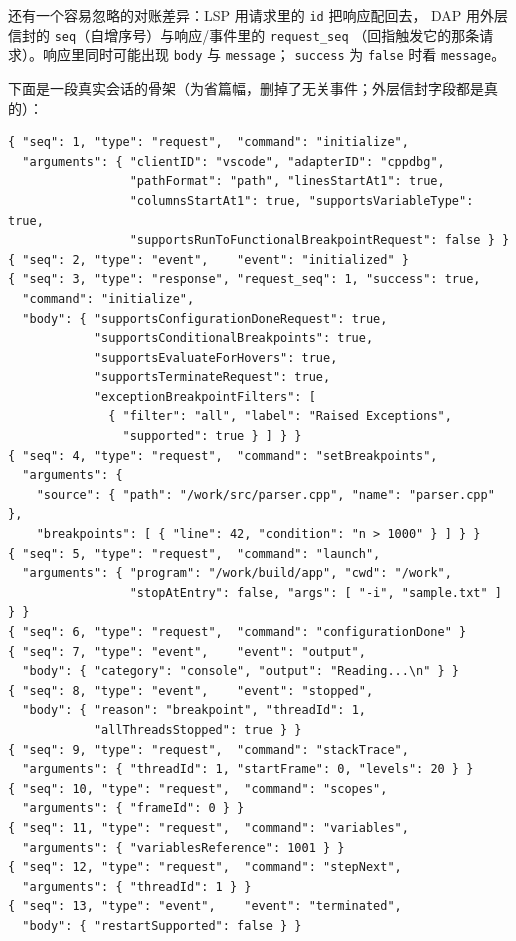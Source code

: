 \documentclass[12pt,a4paper,fontset=fandol]{ctexbook}
\begin{document}
还有一个容易忽略的对账差异：LSP 用请求里的 \texttt{id} 把响应配回去，
DAP 用外层信封的 \texttt{seq}（自增序号）与响应/事件里的 \texttt{request\_seq}
（回指触发它的那条请求）。响应里同时可能出现 \texttt{body} 与 \texttt{message}；
\texttt{success} 为 \texttt{false} 时看 \texttt{message}。

下面是一段真实会话的骨架（为省篇幅，删掉了无关事件；外层信封字段都是真的）：

\begin{lstlisting}[style=jsonstyle,caption={一次 cppdbg 断点会话的 DAP 报文骨架（请求/响应/事件三类）},label={lst:ch07-dap}]
{ "seq": 1, "type": "request",  "command": "initialize",
  "arguments": { "clientID": "vscode", "adapterID": "cppdbg",
                 "pathFormat": "path", "linesStartAt1": true,
                 "columnsStartAt1": true, "supportsVariableType": true,
                 "supportsRunToFunctionalBreakpointRequest": false } }
{ "seq": 2, "type": "event",    "event": "initialized" }
{ "seq": 3, "type": "response", "request_seq": 1, "success": true,
  "command": "initialize",
  "body": { "supportsConfigurationDoneRequest": true,
            "supportsConditionalBreakpoints": true,
            "supportsEvaluateForHovers": true,
            "supportsTerminateRequest": true,
            "exceptionBreakpointFilters": [
              { "filter": "all", "label": "Raised Exceptions",
                "supported": true } ] } }
{ "seq": 4, "type": "request",  "command": "setBreakpoints",
  "arguments": {
    "source": { "path": "/work/src/parser.cpp", "name": "parser.cpp" },
    "breakpoints": [ { "line": 42, "condition": "n > 1000" } ] } }
{ "seq": 5, "type": "request",  "command": "launch",
  "arguments": { "program": "/work/build/app", "cwd": "/work",
                 "stopAtEntry": false, "args": [ "-i", "sample.txt" ] } }
{ "seq": 6, "type": "request",  "command": "configurationDone" }
{ "seq": 7, "type": "event",    "event": "output",
  "body": { "category": "console", "output": "Reading...\n" } }
{ "seq": 8, "type": "event",    "event": "stopped",
  "body": { "reason": "breakpoint", "threadId": 1,
            "allThreadsStopped": true } }
{ "seq": 9, "type": "request",  "command": "stackTrace",
  "arguments": { "threadId": 1, "startFrame": 0, "levels": 20 } }
{ "seq": 10, "type": "request",  "command": "scopes",
  "arguments": { "frameId": 0 } }
{ "seq": 11, "type": "request",  "command": "variables",
  "arguments": { "variablesReference": 1001 } }
{ "seq": 12, "type": "request",  "command": "stepNext",
  "arguments": { "threadId": 1 } }
{ "seq": 13, "type": "event",    "event": "terminated",
  "body": { "restartSupported": false } }
\end{lstlisting}
\end{document}

